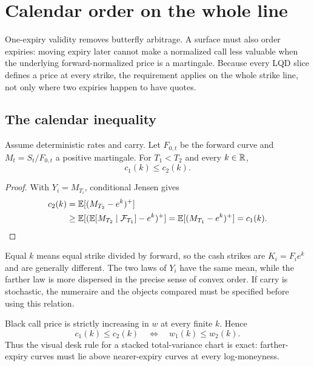 \section{Calendar order on the whole line}
\label{sec:calendar}

One-expiry validity removes butterfly arbitrage.  A surface must also order
expiries: moving expiry later cannot make a normalized call less valuable when
the underlying forward-normalized price is a martingale.  Because every LQD
slice defines a price at every strike, the requirement applies on the whole
strike line, not only where two expiries happen to have quotes.

\subsection{The calendar inequality}

\begin{lemma}
\label{lem:caljensen}
Assume deterministic rates and carry.  Let $F_{0,t}$ be the forward curve and
$M_t=S_t/F_{0,t}$ a positive martingale.  For $T_1<T_2$ and every
$k\in\mathbb{R}$,
\begin{equation}
c_1(k)\le c_2(k).
\label{eq:calreq}
\end{equation}
\end{lemma}

\begin{proof}
With $Y_i=M_{T_i}$, conditional Jensen gives
\[
\begin{aligned}
c_2(k)
&=\mathbb{E}[(M_{T_2}-e^k)^+]\\
&\ge\mathbb{E}[(\mathbb{E}[M_{T_2}\mid\mathcal F_{T_1}]-e^k)^+]
=\mathbb{E}[(M_{T_1}-e^k)^+]=c_1(k).
\end{aligned}
\]
\end{proof}

Equal $k$ means equal strike divided by forward, so the cash strikes are
$K_i=F_i e^k$ and are generally different.  The two laws of $Y_i$ have the
same mean, while the farther law is more dispersed in the precise sense of
convex order.  If carry is stochastic, the numeraire and the objects compared
must be specified before using this relation.

Black call price is strictly increasing in $w$ at every finite $k$.  Hence
\begin{equation}
c_1(k)\le c_2(k)\quad\Longleftrightarrow\quad
w_1(k)\le w_2(k).
\label{eq:calendarvarianceequiv}
\end{equation}
Thus the visual desk rule for a stacked total-variance chart is exact:
farther-expiry curves must lie above nearer-expiry curves at every
log-moneyness.

